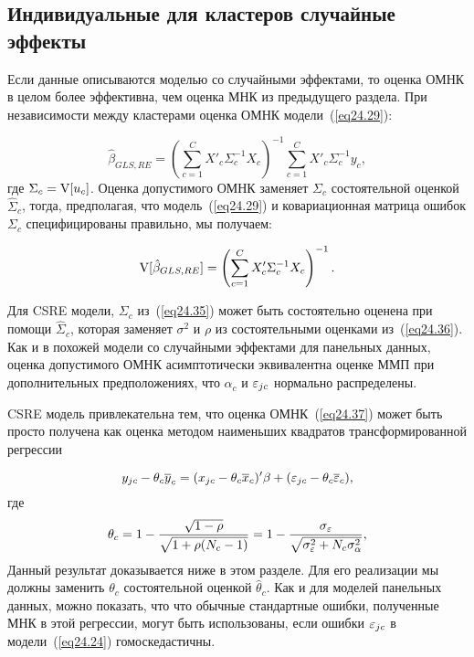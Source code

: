 \subsection{Индивидуальные для кластеров случайные эффекты}

Если данные описываются моделью со случайными эффектами, то оценка ОМНК в целом более эффективна, чем оценка МНК из предыдущего раздела. При независимости между кластерами оценка ОМНК модели~(\ref{eq24.29}):

\begin{equation}
\label{eq24.37}
\hat \beta_{GLS,RE} = \left( \sum_{c=1}^C X'_c \Sigma_c^{-1} X_c \right)^{-1} \sum_{c=1}^C  X'_c \Sigma_c^{-1} y_c,
\end{equation}
где $ \Sigma_c = \mathrm{V}[u_c]$. Оценка допустимого ОМНК заменяет $ \Sigma_c$ состоятельной оценкой $ \hat \Sigma_c$, тогда, предполагая, что модель~(\ref{eq24.29}) и ковариационная матрица ошибок $ \Sigma_c$ специфицированы правильно, мы получаем:

$$
\mathrm{V}[\hat \beta_{GLS,RE}] = \left( \sum_{c=1}^C X'_c \Sigma_c^{-1} X_c \right)^{-1}.
$$

Для CSRE модели, $ \Sigma_c$ из~(\ref{eq24.35}) может быть состоятельно оценена при помощи $ \hat \Sigma_c$, которая заменяет $\sigma^2$ и $\rho$ из состоятельными оценками из~(\ref{eq24.36}). Как и в похожей модели со случайными эффектами для панельных данных, оценка допустимого ОМНК асимптотически эквивалентна оценке ММП при дополнительных предположениях, что $\alpha_c$ и $\varepsilon_{jc}$ нормально распределены. 

CSRE модель привлекательна тем, что оценка ОМНК~(\ref{eq24.37}) может быть просто получена как оценка методом наименьших квадратов трансформированной регрессии

\begin{equation}
\label{eq24.38}
y_{jc} - \theta_c \overline{y}_c = (x_{jc} -\theta_c \overline{x}_c)' \beta + (\varepsilon_{jc} -\theta_c \overline{\varepsilon}_c),
\end{equation}
где
\begin{equation}
\label{eq24.39}
\theta_c = 1 - \frac{\sqrt{1-\rho}}{\sqrt{1+\rho(N_c-1)}} = 1 - \frac{\sigma_{\varepsilon}}{\sqrt{\sigma_{\varepsilon}^2 + N_c \sigma_{\alpha}^2}},
\end{equation}
Данный результат доказывается ниже в этом разделе. Для его реализации мы должны заменить $\theta_c$ состоятельной оценкой $\hat \theta_c$. Как и для моделей панельных данных, можно показать, что что обычные стандартные ошибки, полученные МНК в этой регрессии, могут быть использованы, если ошибки $\varepsilon_{jc}$ в модели~(\ref{eq24.24}) гомоскедастичны. 

